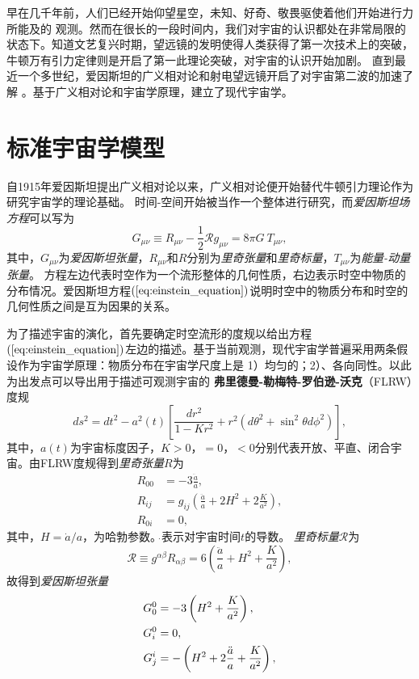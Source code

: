 早在几千年前，人们已经开始仰望星空，未知、好奇、敬畏驱使着他们开始进行力所能及的
观测。然而在很长的一段时间内，我们对宇宙的认识都处在非常局限的状态下。知道文艺复兴时期，望远镜的发明使得人类获得了第一次技术上的突破，牛顿万有引力定律则是开启了第一此理论突破，对宇宙的认识开始加剧。
直到最近一个多世纪，爱因斯坦的广义相对论和射电望远镜开启了对宇宙第二波的加速了解
。基于广义相对论和宇宙学原理，建立了现代宇宙学。

\section{标准宇宙学模型}
自1915年爱因斯坦提出广义相对论以来，广义相对论便开始替代牛顿引力理论作为研究宇宙学的理论基础。
时间-空间开始被当作一个整体进行研究，而\textit{爱因斯坦场方程}可以写为
\begin{equation}
    \label{eq:einstein_equation}
    G_{\mu\nu}\equiv R_{\mu\nu}-\frac{1}{2}\mathcal{R}g_{\mu\nu}=8\pi G\ T_{\mu\nu},
\end{equation}
其中，$G_{\mu\nu}$为\textit{爱因斯坦张量}，$R_{\mu\nu}$和$R$分别为\textit{里奇张量}和\textit{里奇标量}，$T_{\mu\nu}$为\textit{能量-动量张量}。
方程左边代表时空作为一个流形整体的几何性质，右边表示时空中物质的分布情况。爱因斯坦方程$(\ref{eq:einstein_equation})$说明时空中的物质分布和时空的几何性质之间是互为因果的关系。

为了描述宇宙的演化，首先要确定时空流形的度规以给出方程$(\ref{eq:einstein_equation})$左边的描述。基于当前观测，现代宇宙学普遍采用两条假设作为宇宙学原理：物质分布在宇宙学尺度上是
1）均匀的；2）、各向同性。以此为出发点可以导出用于描述可观测宇宙的
\textbf{弗里德曼-勒梅特-罗伯逊-沃克}（FLRW）度规
\begin{equation}\label{eq:frw_metric}
    ds^2=dt^2-a^2(t)\left[\frac{dr^2}{1-Kr^2}+r^2\left(d\theta^2+\sin^2\theta
    d\phi^2\right)\right],
\end{equation}
其中，$a(t)$为宇宙标度因子，$K>0$，$=0$，$<0$分别代表开放、平直、闭合宇宙。由FLRW度规得到\textit{里奇张量}$R$为
\begin{align}
  R_{00} &= -3\frac{\ddot{a}}{a}, \\
  R_{ij} &= g_{ij}\left(\frac{\ddot{a}}{a}+2H^2+2\frac{K}{a^2}\right), \\
  R_{0i} &= 0,
\end{align}
其中，$H=\dot{a} /a$，为哈勃参数。$\dot{}$表示对宇宙时间$t$的导数。
\textit{里奇标量}$\mathcal{R}$为
\begin{equation}
    \label{eq:ricci_scalar}
    \mathcal{R} \equiv g^{\alpha\beta}R_{\alpha\beta} =
    6\left(\frac{\ddot{a}}{a}+H^2+\frac{K}{a^2}\right),
\end{equation}
故得到\textit{爱因斯坦张量}
\begin{align}
  \label{eq:einstein_tensor}
  G^{0}_0 &= -3\left(H^2+\frac{K}{a^2}\right), \\
  G^{0}_i &= 0, \\
  G^i_j &= -\left(H^2+ 2 \frac{\ddot{a}}{a}+ \frac{K}{a^2}\right),
\end{align}


